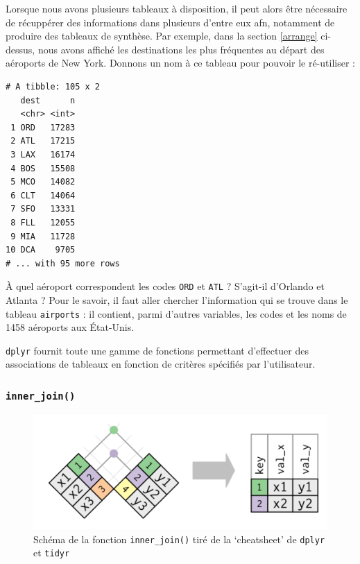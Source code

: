 \documentclass[a4paperpaper,]{article}
\newenvironment{Shaded}{\begin{snugshade}}{\end{snugshade}}
\newcommand{\KeywordTok}[1]{\textcolor[rgb]{0.12,0.11,0.11}{\textbf{#1}}}
\newcommand{\NormalTok}[1]{\textcolor[rgb]{0.12,0.11,0.11}{#1}}
\newcommand{\OperatorTok}[1]{\textcolor[rgb]{0.12,0.11,0.11}{#1}}
\newcommand{\StringTok}[1]{\textcolor[rgb]{0.75,0.01,0.01}{#1}}
\theoremstyle{definition}
\theoremstyle{definition}
\theoremstyle{definition}
\theoremstyle{remark}
\begin{document}
Lorsque nous avons plusieurs tableaux à disposition, il peut alors être
nécessaire de récuppérer des informations dans plusieurs d'entre eux
afn, notamment de produire des tableaux de synthèse. Par exemple, dans
la section \ref{arrange} ci-dessus, nous avons affiché les destinations
les plus fréquentes au départ des aéroports de New York. Donnons un nom
à ce tableau pour pouvoir le ré-utiliser :

\begin{Shaded}
\end{Shaded}

\begin{verbatim}
# A tibble: 105 x 2
   dest      n
   <chr> <int>
 1 ORD   17283
 2 ATL   17215
 3 LAX   16174
 4 BOS   15508
 5 MCO   14082
 6 CLT   14064
 7 SFO   13331
 8 FLL   12055
 9 MIA   11728
10 DCA    9705
# ... with 95 more rows
\end{verbatim}

À quel aéroport correspondent les codes \texttt{ORD} et \texttt{ATL} ?
S'agit-il d'Orlando et Atlanta ? Pour le savoir, il faut aller chercher
l'information qui se trouve dans le tableau \texttt{airports} : il
contient, parmi d'autres variables, les codes et les noms de 1458
aéroports aux État-Unis.

\texttt{dplyr} fournit toute une gamme de fonctions permettant
d'effectuer des associations de tableaux en fonction de critères
spécifiés par l'utilisateur.

\hypertarget{inner_join}{%
\subsubsection{\texorpdfstring{\texttt{inner\_join()}}{inner\_join()}}\label{inner_join}}

\begin{figure}[htpb]

{\centering \includegraphics[width=0.5\linewidth]{images/innerjoin} 

}

\caption{Schéma de la fonction \texttt{inner\_join()} tiré de la
`cheatsheet' de \texttt{dplyr} et \texttt{tidyr}}\label{fig:inner}
\end{figure}
\end{document}
